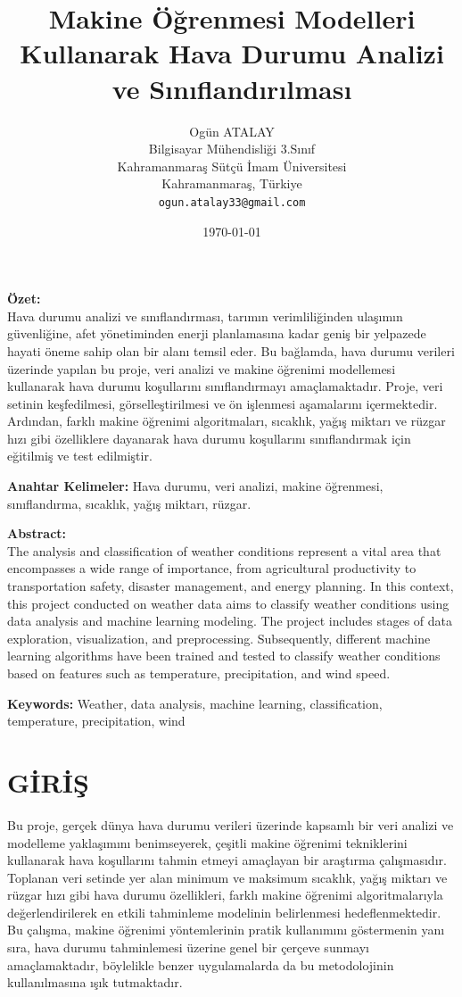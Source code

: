 \documentclass[twocolumn]{article}
\title{\huge\bfseries Makine Öğrenmesi Modelleri Kullanarak Hava Durumu Analizi ve Sınıflandırılması
}
\author{
	Ogün ATALAY\\
	Bilgisayar Mühendisliği 3.Sınıf\\
	Kahramanmaraş Sütçü İmam Üniversitesi\\
	Kahramanmaraş, Türkiye\\
	\texttt{ogun.atalay33@gmail.com}
}
\date{\today}
\begin{document}
	
	\maketitle
	
	\textbf{Özet:} \\
	Hava durumu analizi ve sınıflandırması, tarımın verimliliğinden ulaşımın güvenliğine, afet yönetiminden enerji planlamasına kadar geniş bir yelpazede hayati öneme sahip olan bir alanı temsil eder. Bu bağlamda, hava durumu verileri üzerinde yapılan bu proje, veri analizi ve makine öğrenimi modellemesi kullanarak hava durumu koşullarını sınıflandırmayı amaçlamaktadır. Proje, veri setinin keşfedilmesi, görselleştirilmesi ve ön işlenmesi aşamalarını içermektedir. Ardından, farklı makine öğrenimi algoritmaları, sıcaklık, yağış miktarı ve rüzgar hızı gibi özelliklere dayanarak hava durumu koşullarını sınıflandırmak için eğitilmiş ve test edilmiştir. 
	
	\textbf{Anahtar Kelimeler:} Hava durumu, veri analizi, makine öğrenmesi, sınıflandırma, sıcaklık, yağış miktarı, rüzgar. 
	
	\textbf{Abstract:} \\
	The analysis and classification of weather conditions represent a vital area that encompasses a wide range of importance, from agricultural productivity to transportation safety, disaster management, and energy planning. In this context, this project conducted on weather data aims to classify weather conditions using data analysis and machine learning modeling. The project includes stages of data exploration, visualization, and preprocessing. Subsequently, different machine learning algorithms have been trained and tested to classify weather conditions based on features such as temperature, precipitation, and wind speed.
	
	\textbf{Keywords:} Weather, data analysis, machine learning, classification, temperature, precipitation, wind 
	
	\section{GİRİŞ}
	
	Bu proje, gerçek dünya hava durumu verileri üzerinde kapsamlı bir veri analizi ve modelleme yaklaşımını benimseyerek, çeşitli makine öğrenimi tekniklerini kullanarak hava koşullarını tahmin etmeyi amaçlayan bir araştırma çalışmasıdır. Toplanan veri setinde yer alan minimum ve maksimum sıcaklık, yağış miktarı ve rüzgar hızı gibi hava durumu özellikleri, farklı makine öğrenimi algoritmalarıyla değerlendirilerek en etkili tahminleme modelinin belirlenmesi hedeflenmektedir. Bu çalışma, makine öğrenimi yöntemlerinin pratik kullanımını göstermenin yanı sıra, hava durumu tahminlemesi üzerine genel bir çerçeve sunmayı amaçlamaktadır, böylelikle benzer uygulamalarda da bu metodolojinin kullanılmasına ışık tutmaktadır.
	
\end{document}
